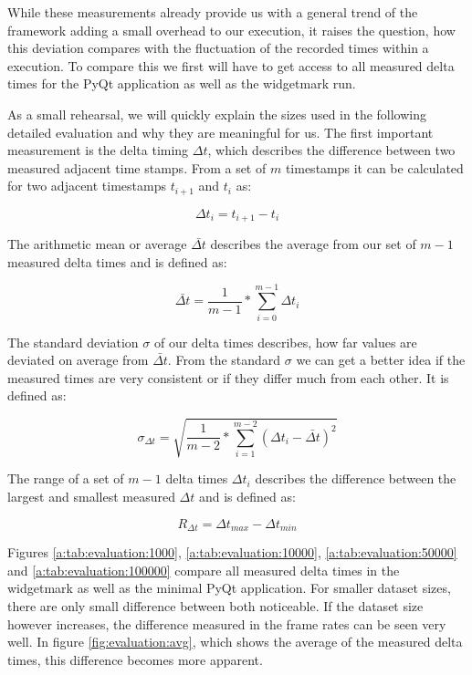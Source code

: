 While these measurements already provide us with a general trend of the
framework adding a small overhead to our execution, it raises the question, how
this deviation compares with the fluctuation of the recorded times within a
execution. To compare this we first will have to get access to all measured
delta times for the PyQt application as well as the widgetmark run.

As a small rehearsal, we will quickly explain the sizes used in the following
detailed evaluation and why they are meaningful for us. The first important
measurement is the delta timing $\Delta t$, which describes the difference
between two measured adjacent time stamps. From a set of $m$ timestamps it can
be calculated for two adjacent timestamps $t_{i+1}$ and $t_i$ as:

$$\Delta t_{i} = t_{i+1} - t_{i}$$

The arithmetic mean or average $\bar{\Delta t}$ describes the average from our
set of $m-1$ measured delta times and is defined as:

$$\bar{\Delta t} = \frac{1}{m-1} * \sum_{i=0}^{m-1} {\Delta t_{i}}$$

The standard deviation $\sigma$ of our delta times describes, how far values are
deviated on average from $\bar{\Delta t}$. From the standard $\sigma$ we can get
a better idea if the measured times are very consistent or if they differ much
from each other. It is defined as:

$$ \sigma_{\Delta t} = \sqrt{\frac{1}{m-2} * \sum_{i=1}^{m-2} (\Delta t_{i} - \bar{\Delta t})^2} $$

The range of a set of $m-1$ delta times $\Delta t_i$ describes the difference
between the largest and smallest measured $\Delta t$ and is defined as:

$$R_{\Delta t} = \Delta t_{max} - \Delta t_{min}$$

Figures \ref{a:tab:evaluation:1000}, \ref{a:tab:evaluation:10000},
\ref{a:tab:evaluation:50000} and \ref{a:tab:evaluation:100000} compare all
measured delta times in the widgetmark as well as the minimal PyQt application.
For smaller dataset sizes, there are only small difference between both
noticeable. If the dataset size however increases, the difference measured in
the frame rates can be seen very well. In figure \ref{fig:evaluation:avg}, which
shows the average of the measured delta times, this difference becomes more
apparent.

